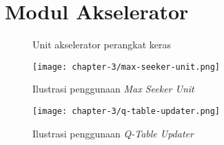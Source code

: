 \chapter{Modul Akselerator}
\label{appendix:modul-akselerator}

\begin{figure}[H]
	\centering
	\caption{Unit akselerator perangkat keras}
	\label{fig:hw-accel}
\end{figure}

\begin{figure}[H]
	\centering
	\begin{sideways}
		\texttt{[image: chapter-3/max-seeker-unit.png]}
	\end{sideways}
	\caption{Ilustrasi penggunaan \textit{Max Seeker Unit}}
	\label{fig:max-seeker-unit}
\end{figure}

\begin{figure}[H]
	\centering
	\begin{sideways}
		\texttt{[image: chapter-3/q-table-updater.png]}
	\end{sideways}
	\caption{Ilustrasi penggunaan \textit{Q-Table Updater}}
	\label{fig:q-table-updater}
\end{figure}
